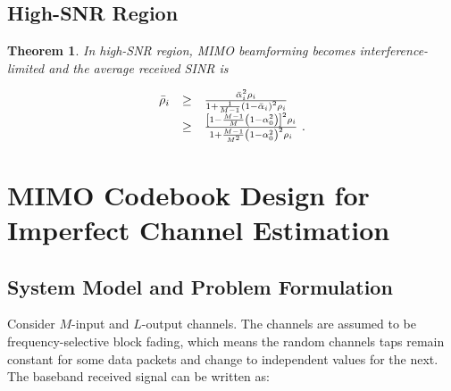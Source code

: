 \documentclass[a4paper,10pt,fleqn, twocolumn]{IEEEtran}
\newtheorem{theorem}{Theorem}
\begin{document}
\subsection{High-SNR Region}
\begin{theorem} In high-SNR region, MIMO beamforming becomes interference-limited and the average received SINR
is

\begin{equation}\hspace{-0.0in}
\begin{array}{rcl}
 \bar\rho_{i}&\geq&\frac{\bar\alpha_{i}^{2}\rho_{i}}{1+
\frac{1}{M-1}\left(1-\bar\alpha_{i}\right)^{2}\rho_{i}}\\
&\geq&\frac{\left[1-\frac{M-1}{M}\left(1-\alpha_{0}^2\right)\right]^2\rho_{i}}{1+
\frac{M-1}{M^2}\left(1-\alpha_{0}^2\right)^{2}\rho_{i}}\ .
\end{array}
\end{equation}

\end{theorem}

\begin{figure}
\end{figure}

\section{MIMO Codebook Design for Imperfect Channel Estimation}

\subsection{System Model and Problem Formulation}
Consider $M$-input and $L$-output channels. The channels are
assumed to be frequency-selective block fading, which means the
random channels taps remain constant for some data packets and
change to independent values for the next. The baseband received
signal can be written as:
\end{document}
